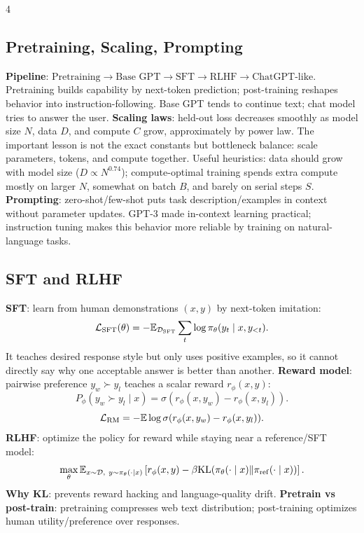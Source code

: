 \documentclass{article}
\newcommand{\key}[1]{\textbf{#1}}
\newcommand{\E}{\mathbb{E}}
\newcommand{\KL}{\mathrm{KL}}
\newcommand{\1}{\mathbf 1}
\begin{document}
\begin{multicols*}{4}
\subsection{Pretraining, Scaling, Prompting}
\key{Pipeline}: $\text{Pretraining}\to\text{Base GPT}\to\text{SFT}\to\text{RLHF}\to\text{ChatGPT-like}$. Pretraining builds capability by next-token prediction; post-training reshapes behavior into instruction-following. Base GPT tends to continue text; chat model tries to answer the user.
\key{Scaling laws}: held-out loss decreases smoothly as model size $N$, data $D$, and compute $C$ grow, approximately by power law. The important lesson is not the exact constants but bottleneck balance: scale parameters, tokens, and compute together. Useful heuristics: data should grow with model size ($D\propto N^{0.74}$); compute-optimal training spends extra compute mostly on larger $N$, somewhat on batch $B$, and barely on serial steps $S$.
\key{Prompting}: zero-shot/few-shot puts task description/examples in context without parameter updates. GPT-3 made in-context learning practical; instruction tuning makes this behavior more reliable by training on natural-language tasks.

\subsection{SFT and RLHF}
\key{SFT}: learn from human demonstrations $(x,y)$ by next-token imitation:
\[
\mathcal L_{\rm SFT}(\theta)
=-\E_{\mathcal D_{\rm SFT}}\sum_t\log\pi_\theta(y_t\mid x,y_{<t}).
\]
It teaches desired response style but only uses positive examples, so it cannot directly say why one acceptable answer is better than another. \key{Reward model}: pairwise preference $y_w\succ y_l$ teaches a scalar reward $r_\phi(x,y)$:
\[
P_\phi(y_w\succ y_l\mid x)=\sigma(r_\phi(x,y_w)-r_\phi(x,y_l)).
\]
\[
\mathcal L_{\rm RM}=-\E\log\sigma(r_\phi(x,y_w)-r_\phi(x,y_l)).
\]
\key{RLHF}: optimize the policy for reward while staying near a reference/SFT model:
\[
\max_\theta\E_{x\sim\mathcal D,\ y\sim\pi_\theta(\cdot\mid x)}
\left[r_\phi(x,y)-\beta\KL(\pi_\theta(\cdot\mid x)\|\pi_{\rm ref}(\cdot\mid x))\right].
\]
\key{Why KL}: prevents reward hacking and language-quality drift. \key{Pretrain vs post-train}: pretraining compresses web text distribution; post-training optimizes human utility/preference over responses.


\end{multicols*}
\end{document}
